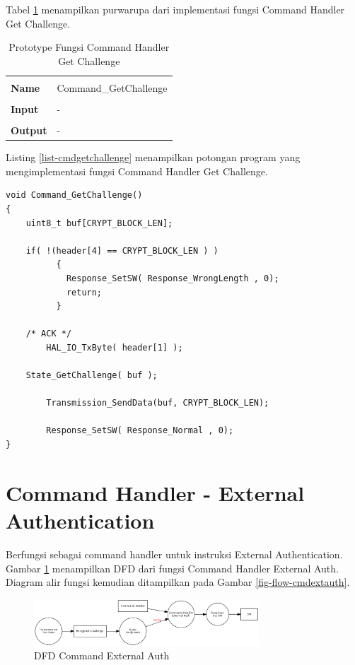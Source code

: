 Tabel \ref{tabel-cmdgetchallenge} menampilkan purwarupa dari implementasi fungsi Command Handler Get Challenge.

\begin{table}[h]
  \centering
  \begin{tabular}{p{2cm} p{8cm}}
    \hline\\
    {\bf Name} & Command\_GetChallenge\\
    \hline\\
    {\bf Input} & -
    \\
    \hline\\
    {\bf Output} & -
    \\
    \hline
  \end{tabular}
  \caption{Prototype Fungsi Command Handler Get Challenge}
  \label{tabel-cmdgetchallenge}
\end{table}

Listing \ref{list-cmdgetchallenge} menampilkan potongan program yang mengimplementasi fungsi Command Handler Get Challenge.

\begin{lstlisting}[caption={Listing Program Fungsi Command Handler Get Challenge}, label={list-cmdgetchallenge}]
void Command_GetChallenge()
{
	uint8_t buf[CRYPT_BLOCK_LEN];

	if( !(header[4] == CRYPT_BLOCK_LEN ) )
          {
            Response_SetSW( Response_WrongLength , 0);
            return;
          }

	/* ACK */
        HAL_IO_TxByte( header[1] );

	State_GetChallenge( buf );

        Transmission_SendData(buf, CRYPT_BLOCK_LEN);

        Response_SetSW( Response_Normal , 0);
}
\end{lstlisting}


\section{Command Handler - External Authentication}
\label{sec_cmdextauth}

Berfungsi sebagai command handler untuk instruksi External Authentication. Gambar \ref{fig-dfd-cmdextauth} menampilkan DFD dari fungsi Command Handler External Auth. Diagram alir fungsi kemudian ditampilkan pada Gambar \ref{fig-flow-cmdextauth}. 

\begin{figure}[h]
\centering
\includegraphics[width=0.75\textwidth]{image/command/dfd_cmdextauth.png}
\caption{DFD Command External Auth}
\label{fig-dfd-cmdextauth}
\end{figure}

